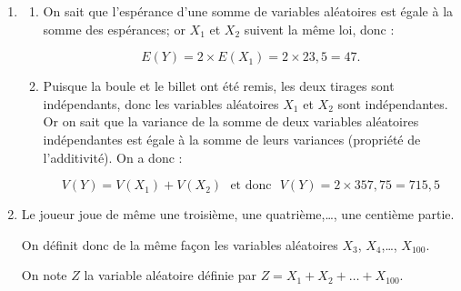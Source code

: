\begin{enumerate}
L'espérance de $X_{1}$ est donc :
\[E\left(X_{1}\right) = 10 \times \np{0,6625} + 50 \times \np{0,3375} = 6,625 + 16,875 = \boxed{23,5}.\]

\smallskip

La variance de $X_{1}$ est donc :

\[\aligned
V\left(X_{1}\right)
& = E\left(X_{1}^{2}\right) - \left[E\left(X_{1}\right)\right]^{2} = \left (100 \times \np{0,6625} + \np{2500}\times \np{0,3375} \right )- 23,5^{2}\\
& = 66,25 + 843,75 - 552,25 = \boxed{357,75}.
\endaligned\]

\item
	\begin{enumerate}
		\item On sait que l'espérance d'une somme de variables aléatoires est égale à la somme des espérances; or $X_{1}$ et $X_{2}$ suivent la même loi, donc :

		\[E(Y) = 2 \times E\left(X_{1}\right) = 2 \times 23,5 = \boxed{47}.\]

		\item Puisque la boule et le billet ont été remis, les deux tirages sont indépendants, donc les variables aléatoires $X_{1}$ et $X_{2}$ sont indépendantes. Or on sait que la variance de la somme de deux variables aléatoires indépendantes est égale à la somme de leurs variances (propriété de l'additivité). On a donc :

\[\boxed{V(Y) = V\left(X_{1}\right) + V\left(X_{2}\right)} \text{~~et donc~~} \boxed{V(Y)=2\times 357,75 = 715,5}\]
	\end{enumerate}

\item Le joueur joue de même une troisième, une quatrième,\ldots, une centième partie.

On définit donc de la même façon les variables aléatoires $X_3$, $X_4$,\ldots, $X_{100}$.

On note $Z$ la variable aléatoire définie par $Z = X_1 + X_2 + \ldots + X_{100}$.



\end{enumerate}
